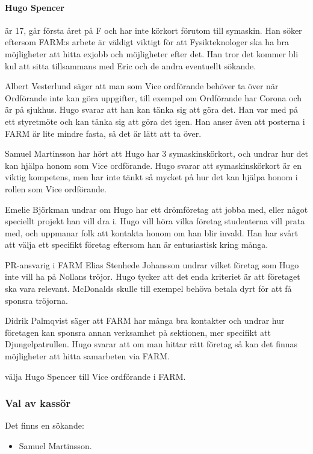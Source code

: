 \documentclass[hidelinks]{sektionsmote} %
\begin{document}
\paragraph{Hugo Spencer} är 17, går första året på F och har inte körkort förutom till symaskin.
Han söker eftersom FARM:s arbete är väldigt viktigt för att Fysikteknologer ska ha bra möjligheter att hitta exjobb och möjligheter efter det.
Han tror det kommer bli kul att sitta tillsammans med Eric och de andra eventuellt sökande.\par
Albert Vesterlund säger att man som Vice ordförande behöver ta över när Ordförande inte kan göra uppgifter, till exempel om Ordförande har Corona och är på sjukhus.
Hugo svarar att han kan tänka sig att göra det.
Han var med på ett styretmöte och kan tänka sig att göra det igen.
Han anser även att posterna i FARM är lite mindre fasta, så det är lätt att ta över.\par
Samuel Martinsson har hört att Hugo har 3 symaskinskörkort, och undrar hur det kan hjälpa honom som Vice ordförande.
Hugo svarar att symaskinskörkort är en viktig kompetens, men har inte tänkt så mycket på hur det kan hjälpa honom i rollen som Vice ordförande.\par
Emelie Björkman undrar om Hugo har ett drömföretag att jobba med, eller något speciellt projekt han vill dra i.
Hugo vill höra vilka företag studenterna vill prata med, och uppmanar folk att kontakta honom om han blir invald.
Han har svårt att välja ett specifikt företag eftersom han är entusiastisk kring många.\par
PR-ansvarig i FARM Elias Stenhede Johansson undrar vilket företag som Hugo inte vill ha på Nollans tröjor.
Hugo tycker att det enda kriteriet är att företaget ska vara relevant.
McDonalds skulle till exempel behöva betala dyrt för att få sponsra tröjorna.\par
Didrik Palmqvist säger att FARM har många bra kontakter och undrar hur företagen kan sponsra annan verksamhet på sektionen, mer specifikt att Djungelpatrullen.
Hugo svarar att om man hittar rätt företag så kan det finnas möjligheter att hitta samarbeten via FARM.

\begin{beslut}
  \item välja Hugo Spencer till Vice ordförande i FARM.
\end{beslut}

\subsubsection{Val av kassör}
Det finns en sökande:
\begin{itemize}
    \item Samuel Martinsson.
\end{itemize}
\end{document}
